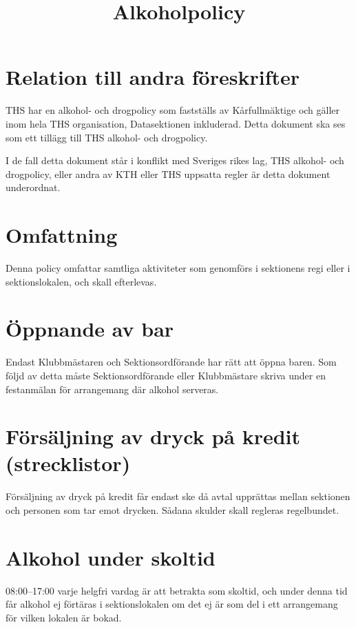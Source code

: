 \documentclass{dgovdoc}
\title{Alkoholpolicy}
\begin{document}
\maketitle

\section{Relation till andra föreskrifter}

THS har en alkohol- och drogpolicy som fastställs av Kårfullmäktige och gäller
inom hela THS organisation, Datasektionen inkluderad. Detta dokument ska ses
som ett tillägg till THS alkohol- och drogpolicy.

I de fall detta dokument står i konflikt med Sveriges rikes lag, THS alkohol-
och drogpolicy, eller andra av KTH eller THS uppsatta regler är detta dokument
underordnat.

\section{Omfattning}

Denna policy omfattar samtliga aktiviteter som genomförs i sektionens regi
eller i sektionslokalen, och skall efterlevas.

\section{Öppnande av bar}

Endast Klubbmästaren och Sektionsordförande har rätt att öppna baren. Som följd
av detta måste Sektionsordförande eller Klubbmästare skriva under en
festanmälan för arrangemang där alkohol serveras.

\section{Försäljning av dryck på kredit (strecklistor)}

Försäljning av dryck på kredit får endast ske då avtal upprättas mellan
sektionen och personen som tar emot drycken. Sådana skulder skall regleras
regelbundet.

\section{Alkohol under skoltid}

08:00--17:00 varje helgfri vardag är att betrakta som skoltid, och under denna
tid får alkohol ej förtäras i sektionslokalen om det ej är som del i ett
arrangemang för vilken lokalen är bokad.
\end{document}
